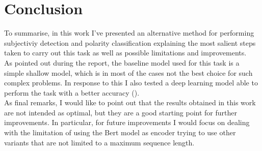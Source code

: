 
\vspace{-.5cm}
\section{Conclusion}
\label{sec:end}
To summarise, in this work I've presented an alternative method for performing subjectiviy detection and polarity classification explaining the most salient steps taken to 
carry out this task as well as possible limitations and improvements.\\
As pointed out during the report, the baseline model used for this task is a simple shallow model, which is in most of the cases not the best choice for such complex problems. 
In response to this I also tested a deep learning model able to perform the task with a better accuracy (\textbf{}).\\
As final remarks, I would like to point out that the results obtained in this work are not intended as optimal, but they are a good starting point for further improvements. 
In particular, for future improvements I would focus on dealing with the limitation of using the Bert model as encoder trying to use other variants that are not limited to 
a maximum sequence length. 

